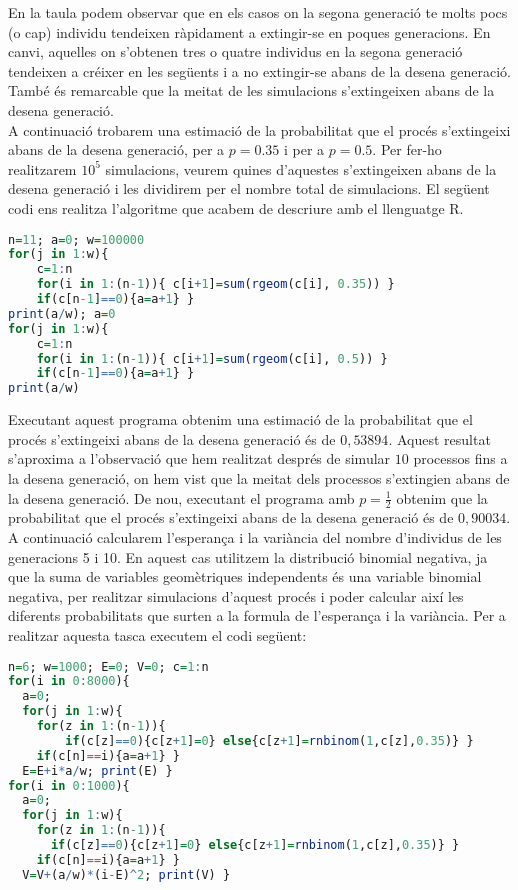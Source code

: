 \documentclass[11pt,a4paper]{article}
\begin{document}
En la taula podem observar que en els casos on la segona generació te molts pocs (o cap) individu tendeixen ràpidament a extingir-se en poques generacions. En canvi, aquelles on s'obtenen tres o quatre individus en la segona generació tendeixen a créixer en les següents i a no extingir-se abans de la desena generació. També és remarcable que la meitat de les simulacions s'extingeixen abans de la desena generació.\\
A continuació trobarem una estimació de la probabilitat que el procés s'extingeixi abans de la desena generació, per a $p=0.35$ i per a $p=0.5$. Per fer-ho realitzarem $10^5$ simulacions, veurem quines d'aquestes s'extingeixen abans de la desena generació i les dividirem per el nombre total de simulacions. El següent codi ens realitza l'algoritme que acabem de descriure amb el llenguatge R.
\begin{center}
  \begin{lstlisting}[language=R, caption={Estimació de la probabilitat que el procés s'extingeixi abans de la generació 10},xleftmargin=.15\textwidth,xrightmargin=.15\textwidth]
n=11; a=0; w=100000
for(j in 1:w){
    c=1:n 
    for(i in 1:(n-1)){ c[i+1]=sum(rgeom(c[i], 0.35)) }
    if(c[n-1]==0){a=a+1} }
print(a/w); a=0
for(j in 1:w){
    c=1:n 
    for(i in 1:(n-1)){ c[i+1]=sum(rgeom(c[i], 0.5)) }
    if(c[n-1]==0){a=a+1} }
print(a/w)
\end{lstlisting}
\end{center}
Executant aquest programa obtenim una estimació de la probabilitat que el procés s'extingeixi abans de la desena generació és de $0,53894$. Aquest resultat s'aproxima a l'observació que hem realitzat després de simular $10$ processos fins a la desena generació, on hem vist que la meitat dels processos s'extingien abans de la desena generació. De nou, executant el programa amb $p=\frac{1}{2}$ obtenim que la probabilitat que el procés s'extingeixi abans de la desena generació és de $0,90034$.\\
A continuació calcularem l'esperança i la variància del nombre d'individus de les generacions 5 i 10. En aquest cas utilitzem la distribució binomial negativa, ja que la suma de variables geomètriques independents és una variable binomial negativa, per realitzar simulacions d'aquest procés i poder calcular així les diferents probabilitats que surten a la formula de l'esperança i la variància. Per a realitzar aquesta tasca executem el codi següent:
\begin{center}
  \begin{lstlisting}[language=R, caption={Càlcul de l'esperança i la variància per a la cinquena i desena generació},xleftmargin=.05\textwidth,xrightmargin=.05\textwidth]
n=6; w=1000; E=0; V=0; c=1:n
for(i in 0:8000){
  a=0;
  for(j in 1:w){
    for(z in 1:(n-1)){ 
        if(c[z]==0){c[z+1]=0} else{c[z+1]=rnbinom(1,c[z],0.35)} }
    if(c[n]==i){a=a+1} }
  E=E+i*a/w; print(E) }
for(i in 0:1000){
  a=0;
  for(j in 1:w){
    for(z in 1:(n-1)){ 
      if(c[z]==0){c[z+1]=0} else{c[z+1]=rnbinom(1,c[z],0.35)} }
    if(c[n]==i){a=a+1} }
  V=V+(a/w)*(i-E)^2; print(V) }
\end{lstlisting}
\end{center}
\end{document}
